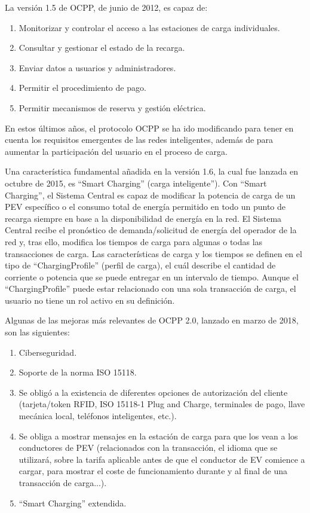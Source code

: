 \documentclass[12pt,a4paper,onecolumn,oneside]{report}
\begin{document}
La versión 1.5 de OCPP, de junio de 2012, es capaz de:

\begin{enumerate}

\item Monitorizar y controlar el acceso a las estaciones de carga individuales.
\item Consultar y gestionar el estado de la recarga.
\item Enviar datos a usuarios y administradores.
\item Permitir el procedimiento de pago.
\item Permitir mecanismos de reserva y gestión eléctrica.

\end{enumerate}

En estos últimos años, el protocolo OCPP se ha ido modificando para tener en cuenta los requisitos emergentes de las redes inteligentes, además de para aumentar la participación del usuario en el proceso de carga.

Una característica fundamental añadida en la versión 1.6, la cual fue lanzada en octubre de 2015, es ``Smart Charging” (carga inteligente”). Con ``Smart Charging”,  el Sistema Central es capaz de modificar la potencia de carga de un PEV específico o el consumo total de energía permitido en todo un punto de recarga siempre en base a la disponibilidad de energía en la red. El Sistema Central recibe el pronóstico de demanda/solicitud de energía del operador de la red y, tras ello, modifica los tiempos de carga para algunas o todas las transacciones de carga. Las características de carga y los tiempos se definen en el tipo de ``ChargingProfile” (perfil de carga), el cuál describe el cantidad de corriente o potencia que se puede entregar en un intervalo de tiempo. Aunque el ``ChargingProfile” puede estar relacionado con una sola transacción de carga, el usuario no tiene un rol activo en su definición.

Algunas de las mejoras más relevantes de OCPP 2.0, lanzado en marzo de 2018, son las siguientes:

\begin{enumerate}

\item Ciberseguridad.
\item Soporte de la norma ISO 15118.
\item Se obligó a la existencia de diferentes opciones de autorización del cliente (tarjeta/token RFID, ISO 15118-1 Plug and Charge, terminales de pago, llave mecánica local, teléfonos inteligentes, etc.).
\item Se obliga a mostrar mensajes en la estación de carga para que los vean a los conductores de PEV (relacionados con la transacción, el idioma que se utilizará, sobre la tarifa aplicable antes de que el conductor de EV comience a cargar, para mostrar el coste de funcionamiento durante y al final de una transacción de carga...).
\item ``Smart Charging” extendida.

\end{enumerate}
\end{document}
